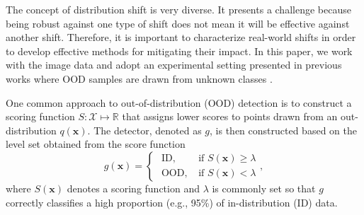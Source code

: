 \documentclass[nohyperref]{article}
\theoremstyle{plain}
\theoremstyle{definition}
\theoremstyle{remark}
\begin{document}
The concept of distribution shift is very diverse. It presents a challenge because being robust against one type of shift does not mean it will be effective against another shift. 
Therefore, it is important to characterize real-world shifts in order to develop effective methods for mitigating their impact.
In this paper, we work with the image data and adopt an experimental setting presented in previous works where OOD samples are drawn from unknown classes \cite{fang2022is, Yang2021Survey}.

One common approach to out-of-distribution (OOD) detection is to construct a scoring function $S: \mathcal{X} \mapsto \mathbb{R}$ that assigns lower scores to points drawn from an out-distribution  $q(\mathbf{x})$. The detector, denoted as $g$, is then constructed based on the level set obtained from the score function
\begin{equation*}
g(\mathbf{x})= \begin{cases}\text { ID}, & \text { if } S(\mathbf{x}) \ge \lambda \\ \text { OOD}, & \text { if } S(\mathbf{x}) < \lambda\end{cases},
\end{equation*}
where $S(\mathbf{x})$ denotes a scoring function and $\lambda$ is commonly set so that $g$ correctly classifies a high proportion (e.g., 95\%) of in-distribution (ID) data.
\end{document}
